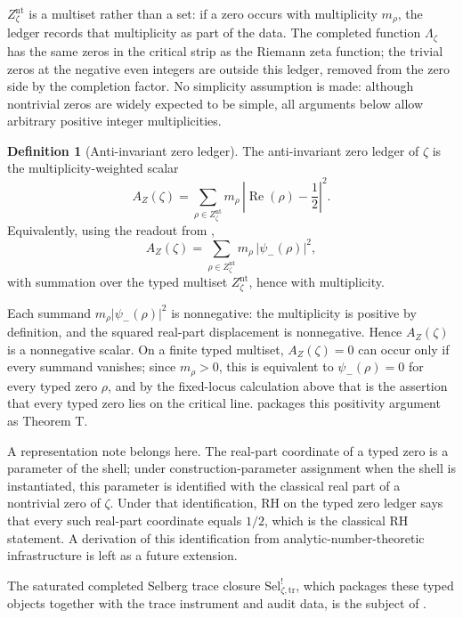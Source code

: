 \documentclass[11pt]{article}
\DeclareMathOperator{\Real}{Re}
\newcommand{\psimRH}{\psi_{-}}
\newcommand{\Lzeta}{\Lambda_{\zeta}}
\newcommand{\Znt}{Z_{\zeta}^{\mathrm{nt}}}
\newcommand{\AZ}{A_{Z}(\zeta)}
\newcommand{\Sel}{\mathrm{Sel}^{!}_{\zeta,\mathrm{tr}}}
\theoremstyle{definition}
\newtheorem{definition}[theorem]{Definition}
\begin{document}
\(\Znt\) is a multiset rather than a set: if a zero occurs with
multiplicity \(m_{\rho}\), the ledger records that multiplicity as
part of the data.  The completed function \(\Lzeta\) has the same
zeros in the critical strip as the Riemann zeta function; the
trivial zeros at the negative even integers are outside this ledger,
removed from the zero side by the completion factor.  No simplicity
assumption is made: although nontrivial zeros are widely expected to
be simple, all arguments below allow arbitrary positive integer
multiplicities.

\begin{definition}[Anti-invariant zero ledger]
\label{def:rh:anti-invariant-zero-ledger}
The anti-invariant zero ledger of \(\zeta\) is the
multiplicity-weighted scalar
\[
  \AZ
    =
  \sum_{\rho\in\Znt}
    m_{\rho}\,
    \left|\Real(\rho)-\frac{1}{2}\right|^{2}.
\]
Equivalently, using the readout from
,
\[
  \AZ
    =
  \sum_{\rho\in\Znt}
    m_{\rho}\,\left|\psimRH(\rho)\right|^{2},
\]
with summation over the typed multiset \(\Znt\), hence with
multiplicity.
\end{definition}

Each summand \(m_{\rho}|\psimRH(\rho)|^{2}\) is nonnegative: the
multiplicity is positive by definition, and the squared real-part
displacement is nonnegative.  Hence \(\AZ\) is a nonnegative scalar.
On a finite typed multiset, \(\AZ=0\) can occur only if every
summand vanishes; since \(m_{\rho}>0\), this is equivalent to
\(\psimRH(\rho)=0\) for every typed zero \(\rho\), and by the
fixed-locus calculation above that is the assertion that every typed
zero lies on the critical line.  
packages this positivity argument as Theorem T.

A representation note belongs here.  The real-part coordinate of a
typed zero is a parameter of the shell; under construction-parameter
assignment when the shell is instantiated, this parameter is
identified with the classical real part of a nontrivial zero of
\(\zeta\).  Under that identification, RH on the typed zero ledger
says that every such real-part coordinate equals \(1/2\), which is the
classical RH statement.  A derivation of this identification from
analytic-number-theoretic infrastructure is left as a future extension.

The saturated completed Selberg trace closure \(\Sel\), which packages
these typed objects together with the trace instrument and audit data,
is the subject of .
 
\end{document}
